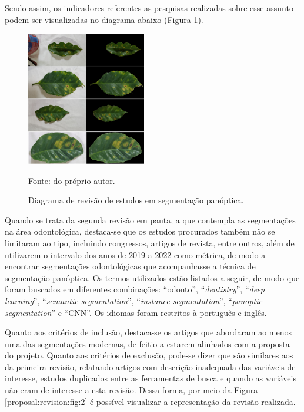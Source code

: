 Sendo assim, os indicadores referentes as pesquisas realizadas sobre esse assunto podem ser visualizadas no diagrama abaixo (Figura \ref{proposal:revision:fig:1}).

\begin{figure}[H]
    \centering
    \caption{Diagrama de revisão de estudos em segmentação panóptica.}
    \includegraphics[height=2.3in]{recursos/imagens/introduction/grabcut.png}
    \label{proposal:revision:fig:1}

    \vspace*{1 cm}
    Fonte: do próprio autor.
\end{figure}

Quando se trata da segunda revisão em pauta, a que contempla as segmentações na área odontológica, destaca-se que os estudos procurados também não se limitaram ao tipo, incluindo congressos, artigos de revista, entre outros, além de utilizarem o intervalo dos anos de 2019 a 2022 como métrica, de modo a encontrar segmentações odontológicas que acompanhasse a técnica de segmentação panóptica. Os termos utilizados estão listados a seguir, de modo que foram buscados em diferentes combinações: ``odonto'', ``\textit{dentistry}'', ``\textit{deep learning}'', ``\textit{semantic segmentation}'', ``\textit{instance segmentation}'', ``\textit{panoptic segmentation}'' e ``CNN''. Os idiomas foram restritos à português e inglês.

Quanto aos critérios de inclusão, destaca-se os artigos que abordaram ao menos uma das segmentações modernas, de feitio a estarem alinhados com a proposta do projeto. Quanto aos critérios de exclusão, pode-se dizer que são similares aos da primeira revisão, relatando artigos com descrição inadequada das variáveis de interesse, estudos duplicados entre as ferramentas de busca e quando as variáveis não eram de interesse a esta revisão. Dessa forma, por meio da Figura \ref{proposal:revision:fig:2} é possível visualizar a representação da revisão realizada.

